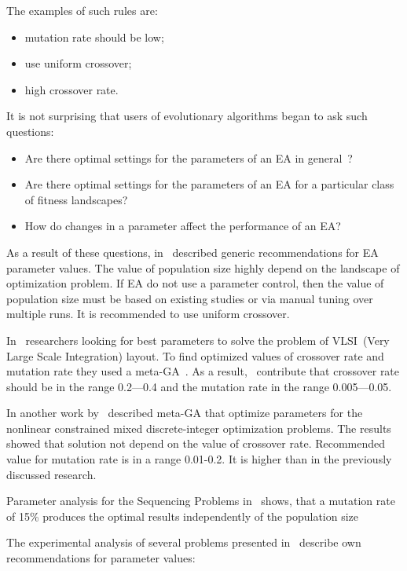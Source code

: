 The examples of such rules are:
\begin{itemize}
	\item mutation rate should be low;
	\item use uniform crossover;
	\item high crossover rate.
\end{itemize}

It is not surprising that users of evolutionary algorithms began to ask such questions:
\begin{itemize}
	\item Are there optimal settings for the parameters of an EA in general~\cite{de2007parameter}?
	\item Are there optimal settings for the parameters of an EA for a particular
	class of fitness landscapes?
	\item How do changes in a parameter affect the performance of an EA?
\end{itemize}

As a result of these questions, in~\cite{de2007parameter} described generic recommendations for EA parameter values.
The value of population size highly depend on the landscape of optimization problem. If EA do not use a parameter control, then the value of population size must be based on existing studies or via manual tuning over multiple runs. It is recommended to use uniform crossover. 

In~\cite{shahookar1990genetic} researchers looking for best parameters to solve the problem of VLSI~(Very Large Scale Integration) layout. To find optimized values of crossover rate and mutation rate they used a meta-GA~\cite{clune2005investigations}. As a result,~\cite{shahookar1990genetic} contribute that crossover rate should be in the range 0.2—0.4 and the mutation rate in the range 0.005—0.05.

In another work by~\cite{wu1995genetic} described meta-GA that optimize parameters for the nonlinear constrained mixed discrete-integer optimization problems. The results showed that solution not depend on the value of crossover rate.
Recommended value for mutation rate is in a range 0.01-0.2. It is higher than in the previously discussed research.

Parameter analysis for the Sequencing Problems in~\cite{gockel1997influencing} shows, that a mutation
rate of 15\% produces the optimal results independently of the population size

The experimental analysis of several problems presented in~\cite{sipper2018investigating} describe own recommendations for parameter values: 


